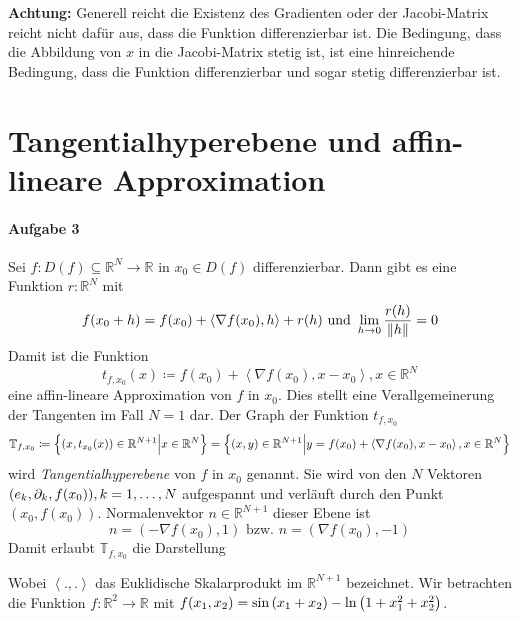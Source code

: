 \documentclass{scrreprt}
\newcommand\skalprod[1]{\left\langle #1 \right\rangle}
\begin{document}
\begin{enumerate}[a)]
  \textbf{Achtung:} Generell reicht die Existenz des Gradienten oder der
  Jacobi-Matrix reicht nicht dafür aus, dass die Funktion differenzierbar ist.
  Die Bedingung, dass die Abbildung von $x$ in die Jacobi-Matrix stetig ist, ist
  eine hinreichende Bedingung, dass die Funktion differenzierbar und sogar stetig
  differenzierbar ist.
\end{enumerate}

\newpage
\section*{Tangentialhyperebene und affin-lineare Approximation}
\paragraph{Aufgabe 3} Sei $f \colon D(f) \subseteq \mathbb{R}^N \to \mathbb{R}$
in $x_0 \in D(f)$ differenzierbar.
Dann gibt es eine Funktion $r \colon \mathbb{R}^N$ mit
\[
  f(x_0 + h) = f(x_0) + \skalprod{\nabla f(x_0), h} + r(h) \text{ und }
  \lim_{h \to 0} \frac{r(h)}{\norm{h}} = 0
\]
Damit ist die Funktion
\[
  t_{f,x_0}(x) \coloneqq f(x_0) + \skalprod{\nabla f(x_0), x - x_0}, x \in \mathbb{R}^N
\]
eine affin-lineare Approximation von $f$ in $x_0$.
Dies stellt eine Verallgemeinerung der Tangenten im Fall $N = 1$ dar.
Der Graph der Funktion $t_{f,x_0}$
\[
  \mathbb{T}_{f, x_0} \coloneqq \qty{\qty(x, t_{x_0}(x)) \in \mathbb{R}^{N + 1} {\Big |} x \in \mathbb{R}^N}
  = \qty{(x, y) \in \mathbb{R}^{N + 1} {\Big |} y = f(x_0) + \skalprod{\nabla f(x_0), x - x_0}, x \in \mathbb{R}^N}
\]
wird \textit{Tangentialhyperebene} von $f$ in $x_0$ genannt.
Sie wird von den $N$ Vektoren $\qty(e_k, \partial_k, f(x_0)), k = 1, \ldots, N$
aufgespannt und verläuft durch den Punkt $(x_0, f(x_0))$.
Normalenvektor $n \in \mathbb{R}^{N + 1}$ dieser Ebene ist
\[
  n = (-\nabla f(x_0), 1) \text{ bzw. } n = (\nabla f(x_0), -1)
\]
Damit erlaubt $\mathbb{T}_{f, x_0}$ die Darstellung
Wobei $\skalprod{., .}$ das Euklidische Skalarprodukt im $\mathbb{R}^{N + 1}$
bezeichnet.
Wir betrachten die Funktion $f \colon \mathbb{R}^2 \to \mathbb{R}$ mit
$f\qty(x_1, x_2) = \sin\qty(x_1 + x_2) - \ln\qty(1 + x_1^2 + x_2^2)$.
\end{document}
